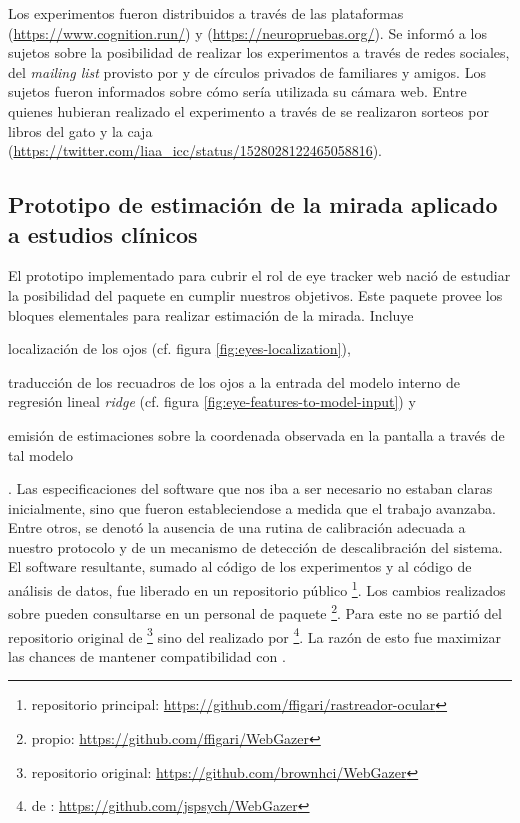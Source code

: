   Los experimentos fueron distribuidos a través de las plataformas \cognition
  (\url{https://www.cognition.run/}) y \neuropruebas
  (\url{https://neuropruebas.org/}).
  Se informó a los sujetos sobre la posibilidad de realizar los experimentos a
  través de redes sociales, del \textit{mailing list} provisto por \neuropruebas
  y de círculos privados de familiares y amigos.
  Los sujetos fueron informados sobre cómo sería utilizada su cámara web.
  Entre quienes hubieran realizado el experimento a través de \neuropruebas se 
  realizaron sorteos por libros del gato y la caja
  (\url{https://twitter.com/liaa_icc/status/1528028122465058816}).

\subsection{Prototipo de estimación de la mirada aplicado a estudios clínicos}

  El prototipo implementado para cubrir el rol de eye tracker web nació de
  estudiar la posibilidad del paquete \webgazer en cumplir nuestros objetivos.
  Este paquete provee los bloques elementales para realizar estimación de la
  mirada.
  Incluye \begin{enumerate*}
    \item localización de los ojos (cf. figura \ref{fig:eyes-localization}),
    \item traducción de los recuadros de los ojos a la entrada del modelo interno
      de regresión lineal \textit{ridge} (cf. figura
      \ref{fig:eye-features-to-model-input}) y
    \item emisión de estimaciones sobre la coordenada observada en la pantalla a
      través de tal modelo
  \end{enumerate*}.
  Las especificaciones del software que nos iba a ser necesario no estaban
  claras inicialmente, sino que fueron estableciendose a medida que el trabajo
  avanzaba.
  Entre otros, se denotó la ausencia de una rutina de calibración adecuada a
  nuestro protocolo y de un mecanismo de detección de descalibración del
  sistema.
  El software resultante, sumado al código de los experimentos y al código de
  análisis de datos, fue liberado en un repositorio público
  \footnote{repositorio principal:
  \url{https://github.com/ffigari/rastreador-ocular}}.
  Los cambios realizados sobre \webgazer pueden consultarse en un \fork
  personal de paquete \footnote{\fork propio:
  \url{https://github.com/ffigari/WebGazer}}.
  Para este \fork no se partió del repositorio original de \webgazer
  \footnote{repositorio original: \url{https://github.com/brownhci/WebGazer}}
  sino del \fork realizado por \jspsych \footnote{\fork de \jspsych:
  \url{https://github.com/jspsych/WebGazer}}.
  La razón de esto fue maximizar las chances de mantener compatibilidad con
  \jspsych.

